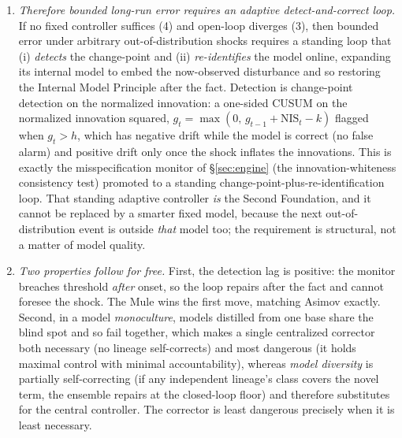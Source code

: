 \documentclass[11pt]{article}
\begin{document}
\begin{enumerate}[label=\arabic*.,itemsep=3pt]
\item \emph{Therefore bounded long-run error requires an adaptive detect-and-correct loop.} If no fixed controller suffices (4) and open-loop diverges (3), then bounded error under arbitrary out-of-distribution shocks requires a standing loop that (i) \emph{detects} the change-point and (ii) \emph{re-identifies} the model online, expanding its internal model to embed the now-observed disturbance and so restoring the Internal Model Principle after the fact. Detection is change-point detection on the normalized innovation: a one-sided CUSUM \cite{page1954} on the normalized innovation squared, $g_t = \max(0,\,g_{t-1}+\mathrm{NIS}_t - k)$ flagged when $g_t>h$, which has negative drift while the model is correct (no false alarm) and positive drift only once the shock inflates the innovations. This is exactly the misspecification monitor of \S\ref{sec:engine} (the innovation-whiteness consistency test) promoted to a standing change-point-plus-re-identification loop. That standing adaptive controller \emph{is} the Second Foundation, and it cannot be replaced by a smarter fixed model, because the next out-of-distribution event is outside \emph{that} model too; the requirement is structural, not a matter of model quality.
\item \emph{Two properties follow for free.} First, the detection lag is positive: the monitor breaches threshold \emph{after} onset, so the loop repairs after the fact and cannot foresee the shock. The Mule wins the first move, matching Asimov exactly. Second, in a model \emph{monoculture}, models distilled from one base share the blind spot and so fail together, which makes a single centralized corrector both necessary (no lineage self-corrects) and most dangerous (it holds maximal control with minimal accountability), whereas \emph{model diversity} is partially self-correcting (if any independent lineage's class covers the novel term, the ensemble repairs at the closed-loop floor) and therefore substitutes for the central controller. The corrector is least dangerous precisely when it is least necessary.
\end{enumerate}
\end{document}
